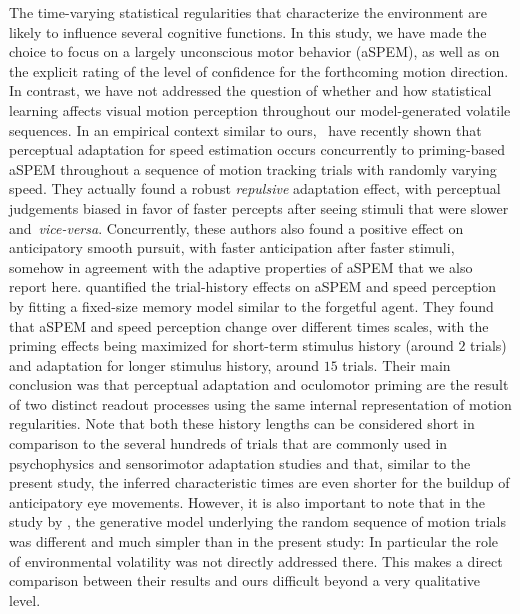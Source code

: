 \documentclass[12pt,english]{article}%
\newcommand{\citet}[1]{\textcite{#1}}
\begin{document}
The time-varying statistical regularities that characterize the environment are likely to influence several cognitive functions. In this study, we have made the choice to focus on a largely unconscious motor behavior (aSPEM), as well as on the explicit rating of the level of confidence for the forthcoming motion direction. In contrast, we have not addressed the question of whether and how statistical learning affects visual motion perception throughout our model-generated volatile sequences.
In an empirical context similar to ours,~\citet{Maus2015} have recently shown that
perceptual adaptation for speed estimation occurs concurrently to
priming-based aSPEM throughout a sequence of motion tracking trials with randomly varying speed. They actually found a robust \emph{repulsive} adaptation effect,
with perceptual judgements biased in favor of faster percepts
after seeing stimuli that were slower and~\textit{vice-versa}.
Concurrently, these authors also found
a positive effect on anticipatory smooth pursuit,
with faster anticipation after faster stimuli, somehow in agreement with the adaptive properties of aSPEM that we also report here.
\citet{Maus2015} quantified the trial-history effects on aSPEM and speed perception by fitting a fixed-size memory model similar to the forgetful agent. They found that aSPEM and speed perception change over different times scales,
with the priming effects being maximized
for short-term stimulus history (around $2$ trials) and
adaptation for longer stimulus history, around $15$ trials.
Their main conclusion was that
perceptual adaptation and oculomotor priming
are the result of two distinct readout processes
using the same internal representation of motion regularities.
Note that both these history lengths can be considered
short in comparison to the several hundreds
of trials that are commonly used in psychophysics and sensorimotor adaptation studies and  that, similar to the present study, the inferred characteristic times are even shorter for the buildup of anticipatory eye movements. However, it is also important to note that in the study by \citet{Maus2015}, the generative model underlying the random sequence of motion trials was different and much simpler than in the present study: In particular the role of environmental volatility was not directly addressed there. This makes a direct comparison between their results and ours difficult beyond a very qualitative level.
\end{document}
